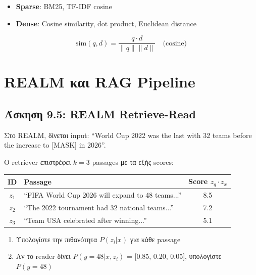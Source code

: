 \begin{infobox}
\begin{itemize}
    \item \textbf{Sparse}: BM25, TF-IDF cosine
    \item \textbf{Dense}: Cosine similarity, dot product, Euclidean distance
\end{itemize}
$$\text{sim}(q, d) = \frac{q \cdot d}{\|q\| \|d\|} \quad \text{(cosine)}$$
\end{infobox}


\section{REALM και RAG Pipeline}

\subsection{Άσκηση 9.5: REALM Retrieve-Read}

\begin{formulabox}[Εκφώνηση]
Στο REALM, δίνεται input: ``World Cup 2022 was the last with 32 teams before
the increase to [MASK] in 2026''.

Ο retriever επιστρέφει $k=3$ passages με τα εξής scores:

\begin{center}
\begin{tabular}{clc}
\toprule
\textbf{ID} & \textbf{Passage} & \textbf{Score} $z_q \cdot z_x$ \\
\midrule
$z_1$ & ``FIFA World Cup 2026 will expand to 48 teams...'' & 8.5 \\
$z_2$ & ``The 2022 tournament had 32 national teams...'' & 7.2 \\
$z_3$ & ``Team USA celebrated after winning...'' & 5.1 \\
\bottomrule
\end{tabular}
\end{center}

\begin{enumerate}
    \item Υπολογίστε την πιθανότητα $P(z_i | x)$ για κάθε passage
    \item Αν το reader δίνει $P(y=48 | x, z_i)$ = [0.85, 0.20, 0.05], υπολογίστε $P(y=48)$
\end{enumerate}
\end{formulabox}


